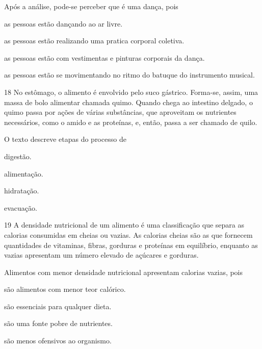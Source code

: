 \noindent{}Após a análise, pode-se perceber que é uma dança, pois

\begin{escolha}
\item as pessoas estão dançando ao ar livre.

\item as pessoas estão realizando uma pratica corporal coletiva.

\item as pessoas estão com vestimentas e pinturas corporais da dança.

\item as pessoas estão se movimentando no ritmo do batuque do instrumento
musical.
\end{escolha}



\pagebreak
\num{18} No estômago, o alimento é envolvido pelo suco gástrico.
Forma-se, assim, uma massa de bolo alimentar chamada quimo. Quando chega
ao intestino delgado, o quimo passa por ações de várias substâncias, que
aproveitam os nutrientes necessários, como o amido e as proteínas, e,
então, passa a ser chamado de quilo.

O texto descreve etapas do processo de

\begin{minipage}{.5\textwidth}
\begin{escolha}
\item digestão.

\item alimentação.

\item hidratação.

\item evacuação.
\end{escolha}
\end{minipage}



\num{19} A densidade nutricional de um alimento é uma classificação
que separa as calorias consumidas em cheias ou vazias. As calorias
cheias são as que fornecem quantidades de vitaminas, fibras, gorduras e
proteínas em equilíbrio, enquanto as vazias apresentam um número elevado
de açúcares e gorduras.

Alimentos com menor densidade nutricional apresentam calorias vazias,
pois

\begin{minipage}{.5\textwidth}
\begin{escolha}
\item são alimentos com menor teor calórico.

\item são essenciais para qualquer dieta.

\item são uma fonte pobre de nutrientes.

\item são menos ofensivos ao organismo.
\end{escolha}
\end{minipage}


